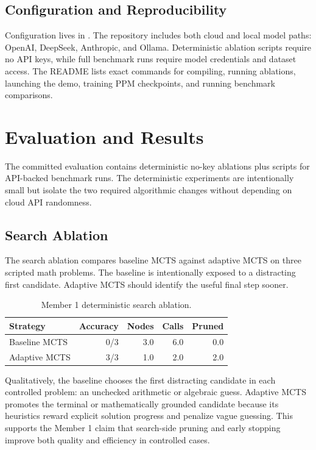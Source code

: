 \documentclass[sigconf,nonacm]{acmart}
\begin{document}
\subsection{Configuration and Reproducibility}

Configuration lives in . The repository includes both
cloud and local model paths: OpenAI, DeepSeek, Anthropic, and Ollama.
Deterministic ablation scripts require no API keys, while full benchmark runs
require model credentials and dataset access. The README lists exact commands
for compiling, running ablations, launching the demo, training PPM checkpoints,
and running benchmark comparisons.

\section{Evaluation and Results}

The committed evaluation contains deterministic no-key ablations plus scripts
for API-backed benchmark runs. The deterministic experiments are intentionally
small but isolate the two required algorithmic changes without depending on
cloud API randomness.

\subsection{Search Ablation}

The search ablation compares baseline MCTS against adaptive MCTS on three
scripted math problems. The baseline is intentionally exposed to a distracting
first candidate. Adaptive MCTS should identify the useful final step sooner.

\begin{table}[h]
\centering
\caption{Member 1 deterministic search ablation.}
\begin{tabular}{lrrrr}
\toprule
Strategy & Accuracy & Nodes & Calls & Pruned \\
\midrule
Baseline MCTS & 0/3 & 3.0 & 6.0 & 0.0 \\
Adaptive MCTS & 3/3 & 1.0 & 2.0 & 2.0 \\
\bottomrule
\end{tabular}
\end{table}

Qualitatively, the baseline chooses the first distracting candidate in each
controlled problem: an unchecked arithmetic or algebraic guess. Adaptive MCTS
promotes the terminal or mathematically grounded candidate because its
heuristics reward explicit solution progress and penalize vague guessing. This
supports the Member 1 claim that search-side pruning and early stopping improve
both quality and efficiency in controlled cases.
\end{document}
